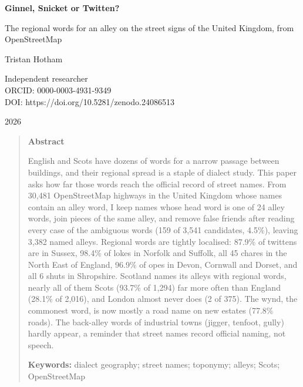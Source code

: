 \documentclass[11pt,a4paper]{article}
\begin{document}
\begin{center}
{\Large\bfseries Ginnel, Snicket or Twitten?\par}
\vspace{0.4em}
{\large The regional words for an alley on the street signs of the United Kingdom, from OpenStreetMap\par}
\vspace{1.2em}
{\large Tristan Hotham\par}
\vspace{0.3em}
{\small Independent researcher\\
ORCID: 0000-0003-4931-9349\\
DOI: https://doi.org/10.5281/zenodo.24086513\par}
\vspace{0.8em}
2026
\end{center}

\begin{quote}
\small
\begin{center}\textbf{Abstract}\end{center}
English and Scots have dozens of words for a narrow passage between buildings, and their regional spread is a staple of dialect study. This paper asks how far those words reach the official record of street names. From 30,481 OpenStreetMap highways in the United Kingdom whose names contain an alley word, I keep names whose head word is one of 24 alley words, join pieces of the same alley, and remove false friends after reading every case of the ambiguous words (159 of 3,541 candidates, 4.5\%), leaving 3,382 named alleys. Regional words are tightly localised: 87.9\% of twittens are in Sussex, 98.4\% of lokes in Norfolk and Suffolk, all 45 chares in the North East of England, 96.9\% of opes in Devon, Cornwall and Dorset, and all 6 shuts in Shropshire. Scotland names its alleys with regional words, nearly all of them Scots (93.7\% of 1,294) far more often than England (28.1\% of 2,016), and London almost never does (2 of 375). The wynd, the commonest word, is now mostly a road name on new estates (77.8\% roads). The back-alley words of industrial towns (jigger, tenfoot, gully) hardly appear, a reminder that street names record official naming, not speech.

\textbf{Keywords:} dialect geography; street names; toponymy; alleys; Scots; OpenStreetMap
\end{quote}
\end{document}
